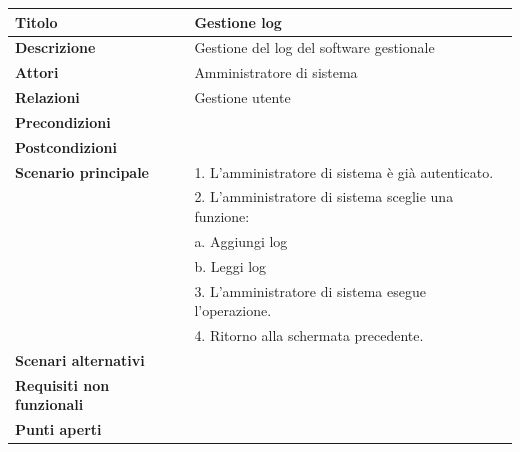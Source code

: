\documentclass[a4paper]{article}
\begin{document}
\begin{center}
\begin{tabularx}{1\textwidth}{|l|X|}
    \hline
	\textbf{Titolo} & Gestione log \\
	\hline
	\textbf{Descrizione} & Gestione del log del software gestionale \\
	\hline
	\textbf{Attori} & Amministratore di sistema \\
	\hline
	\textbf{Relazioni} & Gestione utente \\
	\hline
	\textbf{Precondizioni} &  \\
	\hline
	\textbf{Postcondizioni} &  \\
	\hline
	\textbf{Scenario principale} & 1. L'amministratore di sistema è già autenticato.\\
	                             & 2. L'amministratore di sistema sceglie una funzione: \\
								 & \quad a. Aggiungi log \\
								 & \quad b. Leggi log \\
								 & 3. L'amministratore di sistema esegue l'operazione.\\
								 & 4. Ritorno alla schermata precedente.\\
	\hline
	\textbf{Scenari alternativi} & \\
	\hline
	\textbf{Requisiti non funzionali} & \\
	\hline
	\textbf{Punti aperti} & \\
	\hline
\end{tabularx}
\end{center}

\end{document}
